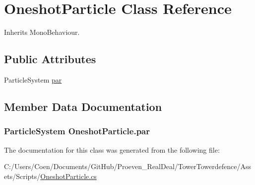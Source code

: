 \hypertarget{class_oneshot_particle}{}\section{Oneshot\+Particle Class Reference}
\label{class_oneshot_particle}


Inherits Mono\+Behaviour.

\subsection*{Public Attributes}
\begin{DoxyCompactItemize}
\item 
Particle\+System \hyperlink{class_oneshot_particle_a6997f7fcd15bfb3a7ceadec29044a454}{par}
\end{DoxyCompactItemize}


\subsection{Member Data Documentation}
\subsubsection[{\texorpdfstring{par}{par}}]{\setlength{\rightskip}{0pt plus 5cm}Particle\+System Oneshot\+Particle.\+par}\hypertarget{class_oneshot_particle_a6997f7fcd15bfb3a7ceadec29044a454}{}\label{class_oneshot_particle_a6997f7fcd15bfb3a7ceadec29044a454}


The documentation for this class was generated from the following file\+:\begin{DoxyCompactItemize}
\item 
C\+:/\+Users/\+Coen/\+Documents/\+Git\+Hub/\+Proeven\+\_\+\+Real\+Deal/\+Tower\+Towerdefence/\+Assets/\+Scripts/\hyperlink{_oneshot_particle_8cs}{Oneshot\+Particle.\+cs}\end{DoxyCompactItemize}
